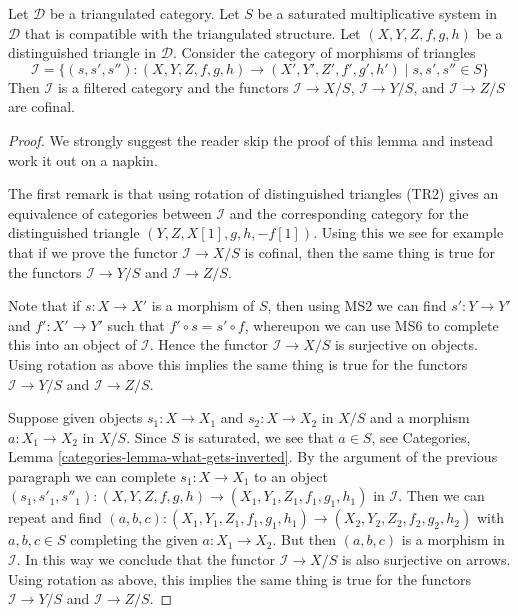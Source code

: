 \begin{lemma}
\label{lemma-limit-triangles}
Let $\mathcal{D}$ be a triangulated category.
Let $S$ be a saturated multiplicative system in $\mathcal{D}$
that is compatible with the triangulated structure.
Let $(X, Y, Z, f, g, h)$ be a distinguished triangle in $\mathcal{D}$.
Consider the category of morphisms of triangles
$$
\mathcal{I} =
\{(s, s', s'') : (X, Y, Z, f, g, h) \to (X', Y', Z', f', g', h')
\mid s, s', s'' \in S\}
$$
Then $\mathcal{I}$ is a filtered category and the functors
$\mathcal{I} \to X/S$, $\mathcal{I} \to Y/S$, and $\mathcal{I} \to Z/S$
are cofinal.
\end{lemma}

\begin{proof}
We strongly suggest the reader skip the proof of this lemma and instead
work it out on a napkin.

\medskip\noindent
The first remark is that using rotation of distinguished triangles (TR2)
gives an equivalence of categories between $\mathcal{I}$ and the
corresponding category for the distinguished triangle
$(Y, Z, X[1], g, h, -f[1])$. Using this we see for example that if
we prove the functor $\mathcal{I} \to X/S$ is cofinal, then
the same thing is true for the functors $\mathcal{I} \to Y/S$ and
$\mathcal{I} \to Z/S$.

\medskip\noindent
Note that if $s : X \to X'$ is a morphism of $S$, then using
MS2 we can find $s' : Y \to Y'$ and $f' : X' \to Y'$ such that
$f' \circ s = s' \circ f$, whereupon we can use MS6 to complete
this into an object of $\mathcal{I}$. Hence the functor
$\mathcal{I} \to X/S$ is surjective on objects. Using rotation as above
this implies the same thing is true for the functors
$\mathcal{I} \to Y/S$ and $\mathcal{I} \to Z/S$.

\medskip\noindent
Suppose given objects $s_1 : X \to X_1 $ and $s_2 : X \to X_2$ in
$X/S$ and a morphism $a : X_1 \to X_2$ in $X/S$. Since $S$ is saturated,
we see that $a \in S$, see
Categories, Lemma \ref{categories-lemma-what-gets-inverted}.
By the argument of the previous paragraph we can complete
$s_1 : X \to X_1$ to an object
$(s_1, s'_1, s''_1) : (X, Y, Z, f, g, h) \to (X_1, Y_1, Z_1, f_1, g_1, h_1)$
in $\mathcal{I}$. Then we can repeat and find
$(a, b, c) : (X_1, Y_1, Z_1, f_1, g_1, h_1) \to (X_2, Y_2, Z_2, f_2, g_2, h_2)$
with $a, b, c \in S$ completing the given $a : X_1 \to X_2$.
But then $(a, b, c)$ is a morphism in $\mathcal{I}$.
In this way we conclude that the functor $\mathcal{I} \to X/S$ is
also surjective on arrows. Using rotation as above,
this implies the same thing is true for the functors
$\mathcal{I} \to Y/S$ and $\mathcal{I} \to Z/S$.


\end{proof}
